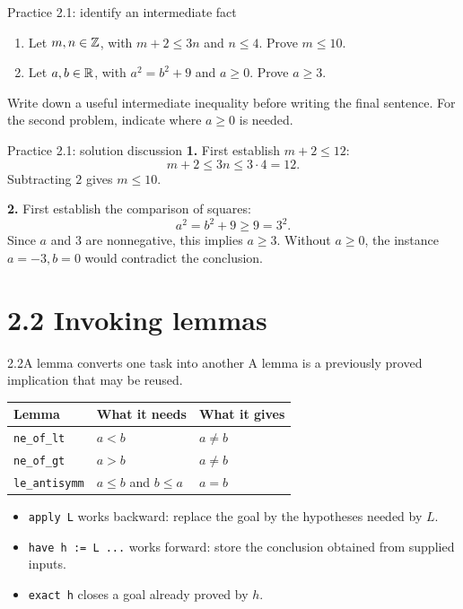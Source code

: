 \begin{frame}{Practice 2.1: identify an intermediate fact}
\begin{enumerate}
\item Let $m,n\in\mathbb{Z}$, with $m+2\le3n$ and $n\le4$. Prove $m\le10$.
\item Let $a,b\in\mathbb{R}$, with $a^2=b^2+9$ and $a\ge0$. Prove $a\ge3$.
\end{enumerate}
\vspace{1em}
Write down a useful intermediate inequality before writing the final sentence.
For the second problem, indicate where $a\ge0$ is needed.
\end{frame}

\begin{frame}{Practice 2.1: solution discussion}
\textbf{1.} First establish $m+2\le12$:
\[
m+2\le3n\le3\cdot4=12.
\]
Subtracting $2$ gives $m\le10$.
\medskip

\textbf{2.} First establish the comparison of squares:
\[
a^2=b^2+9\ge9=3^2.
\]
Since $a$ and $3$ are nonnegative, this implies $a\ge3$.
Without $a\ge0$, the instance $a=-3,b=0$ would contradict the conclusion.
\end{frame}

\section{2.2 Invoking lemmas}
\begin{frame}{2.2\quad A lemma converts one task into another}
A lemma is a previously proved implication that may be reused.
\begin{center}
\begin{tabular}{lll}
\toprule
Lemma & What it needs & What it gives \\
\midrule
\texttt{ne\_of\_lt} & $a<b$ & $a\ne b$ \\
\texttt{ne\_of\_gt} & $a>b$ & $a\ne b$ \\
\texttt{le\_antisymm} & $a\le b$ and $b\le a$ & $a=b$ \\
\bottomrule
\end{tabular}
\end{center}
\begin{itemize}
\item \texttt{apply L} works backward: replace the goal by the hypotheses needed by $L$.
\item \texttt{have h := L ...} works forward: store the conclusion obtained from supplied inputs.
\item \texttt{exact h} closes a goal already proved by $h$.
\end{itemize}
\end{frame}

